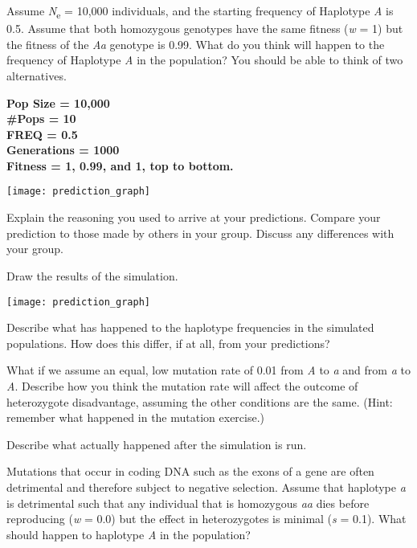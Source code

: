 \documentclass[11pt, addpoints]{exam}
\begin{document}
\begin{questions}
\newpage

\question
Assume \emph{N}\textsubscript{e} = 10,000 individuals, and
the starting frequency of Haplotype \emph{A} is 0.5. Assume that both
homozygous genotypes have the same fitness (\emph{w} = 1) but the
fitness of the \emph{Aa} genotype is 0.99. What do you think will happen
to the frequency of Haplotype \emph{A} in the population? You should be
able to think of two alternatives.

\ifprintanswers
	{\bfseries %
	Pop Size = 10,000\\
	\#Pops = 10\\
	FREQ = 0.5\\
	Generations = 1000\\	
	Fitness = 1, 0.99, and 1, top to bottom. }\vspace*{16\baselineskip}
\else
	\begin{center}
		\texttt{[image: prediction\_graph]}
	\end{center}
\fi

\question
Explain the reasoning you used to arrive at your
predictions. Compare your prediction to those made by others in your
group. Discuss any differences with your group.

\newpage

\question
Draw the results of the simulation.
	\begin{center}
		\texttt{[image: prediction\_graph]}
	\end{center}

\question[1]
Describe what has happened to the haplotype frequencies in
the simulated populations. How does this differ, if at all, from your
predictions?

\newpage

\question[1]
What if we assume an equal, low mutation rate of 0.01 from
\emph{A} to \emph{a} and from \emph{a} to \emph{A}. Describe how you
think the mutation rate will affect the outcome of heterozygote
disadvantage, assuming the other conditions are the same. (Hint:
remember what happened in the mutation exercise.)

\question
Describe what actually happened after the simulation is
run.

\question[1]
Mutations that occur in coding DNA such as the exons of a
gene are often detrimental and therefore subject to negative selection.
Assume that haplotype \emph{a} is detrimental such that any individual
that is homozygous \emph{aa} dies before reproducing (\emph{w} = 0.0)
but the effect in heterozygotes is minimal (\emph{s} = 0.1). What should
happen to haplotype \emph{A} in the population? 


\end{questions}
\end{document}
